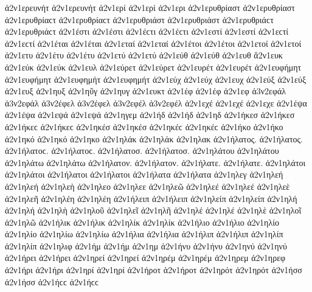{ἀ2ν1ερευνήτ ἀ2ν1ερευνήτ 
ἀ2ν1ερί ἀ2ν1ερί   %
ἀ2ν1ερι 
ἀ2ν1ερυθρίαστ ἀ2ν1ερυθρίαστ ἀ2ν1ερυθρίαϲτ ἀ2ν1ερυθρίαϲτ   %
ἀ2ν1ερυθριάστ ἀ2ν1ερυθριάστ ἀ2ν1ερυθριάϲτ ἀ2ν1ερυθριάϲτ 
ἀ2ν1έστι ἀ2ν1έστι ἀ2ν1έϲτι ἀ2ν1έϲτι   %
ἀ2ν1εστί ἀ2ν1εστί ἀ2ν1εϲτί ἀ2ν1εϲτί 
ἀ2ν1έται ἀ2ν1έται   %
ἀ2ν1εταί ἀ2ν1εταί 
ἀ2ν1έτοι ἀ2ν1έτοι   %
ἀ2ν1ετοί ἀ2ν1ετοί 
ἀ2ν1ετυ   %
ἀ2ν1έτυ ἀ2ν1έτυ   %
ἀ2ν1ετύ ἀ2ν1ετύ 
ἀ2ν1εύθ ἀ2ν1εύθ   %
ἀ2ν1ευθ 
ἄ2ν1ευκ   %
ἀ2ν1εύκ ἀ2ν1εύκ 
ἀ2ν1ευλ   %
ἀ2ν1εύρετ ἀ2ν1εύρετ   %
ἀ2ν1ευρέτ ἀ2ν1ευρέτ 
ἀ2ν1ευφήμητ ἀ2ν1ευφήμητ   %
ἀ2ν1ευφημήτ ἀ2ν1ευφημήτ 
ἀ2ν1εύχ ἀ2ν1εύχ   %
ἀ2ν1ευχ 
ἀ2ν1εύξ ἀ2ν1εύξ   %
ἀ2ν1ευξ 
ἀ2ν1ηυξ   %
ἀ2ν1ηῦγ   %
ἀ2ν1ηυγ 
ἀ2ν1ευκτ   %
ἀ2ν1έφ ἀ2ν1έφ   %
ἀ2ν1εφ 
ἀ3ν2εφάλ ἀ3ν2εφάλ   %
ἀ3ν2έφελ ἀ3ν2έφελ   %
ἀ3ν2εφέλ ἀ3ν2εφέλ 
ἀ2ν1εχέ ἀ2ν1εχέ   %
ἀ2ν1εχε 
ἀ2ν1έψα ἀ2ν1έψα   %
ἀ2ν1εψά ἀ2ν1εψά 
ἀ2ν1ηγεμ   %
ἀ2ν1ήδ ἀ2ν1ήδ   %
ἀ2ν1ηδ 
ἀ2ν1ήκεσ ἀ2ν1ήκεσ ἀ2ν1ήκεϲ ἀ2ν1ήκεϲ   %
ἀ2ν1ηκέσ ἀ2ν1ηκέσ ἀ2ν1ηκέϲ ἀ2ν1ηκέϲ 
ἀ2ν1ήκο ἀ2ν1ήκο   %
ἀ2ν1ηκό ἀ2ν1ηκό 
ἀ2ν1ηκο 
ἀ2ν1ηλάκ ἀ2ν1ηλάκ   %
ἀ2ν1ηλακ 
ἀ2ν1ήλατος. ἀ2ν1ήλατος. ἀ2ν1ήλατοϲ. ἀ2ν1ήλατοϲ.   %
ἀ2ν1ήλατοσ. ἀ2ν1ήλατοσ. 
ἀ2ν1ηλάτου ἀ2ν1ηλάτου 
ἀ2ν1ηλάτω ἀ2ν1ηλάτω 
ἀ2ν1ήλατον. ἀ2ν1ήλατον. 
ἀ2ν1ήλατε. ἀ2ν1ήλατε. 
ἀ2ν1ηλάτοι ἀ2ν1ηλάτοι 
ἀ2ν1ήλατοι ἀ2ν1ήλατοι 
ἀ2ν1ήλατα ἀ2ν1ήλατα 
ἀ2ν1ηλεγ   %
ἀ2ν1ηλεή ἀ2ν1ηλεή   %
ἀ2ν1ηλεὴ 
ἀ2ν1ηλεο 
ἀ2ν1ηλεε 
ἀ2ν1ηλεῶ 
ἀ2ν1ηλεέ ἀ2ν1ηλεέ 
ἀ2ν1ηλεὲ 
ἀ2ν1ηλεῆ 
ἀ2ν1ηλέη ἀ2ν1ηλέη   %
ἀ2ν1ήλειπ ἀ2ν1ήλειπ   %
ἀ2ν1ηλείπ ἀ2ν1ηλείπ 
ἀ2ν1ηλή ἀ2ν1ηλή   %
ἀ2ν1ηλὴ 
ἀ2ν1ηλοῦ 
ἀ2ν1ηλεῖ 
ἀ2ν1ηλῆ 
ἀ2ν1ηλέ ἀ2ν1ηλέ 
ἀ2ν1ηλὲ 
ἀ2ν1ηλοῖ 
ἀ2ν1ηλῶ 
ἀ2ν1ήλικ ἀ2ν1ήλικ   %
ἀ2ν1ηλίκ ἀ2ν1ηλίκ 
ἀ2ν1ήλιο ἀ2ν1ήλιο   %
ἀ2ν1ηλίο ἀ2ν1ηλίο 
ἀ2ν1ηλίω ἀ2ν1ηλίω 
ἀ2ν1ήλια ἀ2ν1ήλια 
ἀ2ν1ήλιπ ἀ2ν1ήλιπ   %
ἀ2ν1ηλίπ ἀ2ν1ηλίπ 
ἀ2ν1ηλιφ   %
ἀ2ν1ήμ ἀ2ν1ήμ   %
ἀ2ν1ημ 
ἀ2ν1ήνυ ἀ2ν1ήνυ   %
ἀ2ν1ηνύ ἀ2ν1ηνύ 
ἀ2ν1ήρει ἀ2ν1ήρει   %
ἀ2ν1ηρεί ἀ2ν1ηρεί 
ἀ2ν1ηρέμ ἀ2ν1ηρέμ   %
ἀ2ν1ηρεμ 
ἀ2ν1ηρεφ   %
ἀ2ν1ήρι ἀ2ν1ήρι   %
ἀ2ν1ηρί ἀ2ν1ηρί 
ἀ2ν1ήροτ ἀ2ν1ήροτ   %
ἀ2ν1ηρότ ἀ2ν1ηρότ 
ἀ2ν1ήσσ ἀ2ν1ήσσ ἀ2ν1ήϲϲ ἀ2ν1ήϲϲ   %
}
